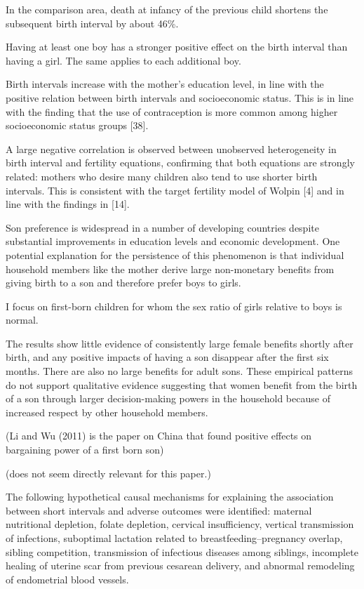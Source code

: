 In the comparison area, death at infancy of the previous child shortens
the subsequent birth interval by about 46\%.

Having at least one boy has a stronger positive effect on the birth
interval than having a girl. The same applies to each additional boy.

Birth intervals increase with the mother’s education level, in line with
the positive relation between birth intervals and socioeconomic status.
This is in line with the finding that the use of contraception is more
common among higher socioeconomic status groups [38].

A large negative correlation is observed between unobserved
heterogeneity in birth interval and fertility equations, confirming that
both equations are strongly related: mothers who desire many children
also tend to use shorter birth intervals. This is consistent with the
target fertility model of Wolpin [4] and in line with the findings in
[14].

\citet{Zimmermann2018}

Son preference is widespread in a number of developing countries despite
substantial improvements in education levels and economic development.
One potential explanation for the persistence of this phenomenon is that
individual household members like the mother derive large non-monetary
beneﬁts from giving birth to a son and therefore prefer boys to girls.

I focus on ﬁrst-born children for whom the sex ratio of girls relative to boys is normal.

The results show little evidence of consistently large female beneﬁts
shortly after birth, and any positive impacts of having a son disappear
after the ﬁrst six months. There are also no large beneﬁts for adult
sons. These empirical patterns do not support qualitative evidence
suggesting that women beneﬁt from the birth of a son through larger
decision-making powers in the household because of increased respect by
other household members.

(Li and Wu (2011) is the paper on China that found positive effects on
bargaining power of a first born son)

(does not seem directly relevant for this paper.)

\citet{Conde-Agudelo2012}

The following hypothetical causal mechanisms for explaining the
association between short intervals and adverse outcomes were
identified: maternal nutritional depletion, folate depletion, cervical
insufficiency, vertical transmission of infections, suboptimal lactation
related to breastfeeding–pregnancy overlap, sibling competition,
transmission of infectious diseases among siblings, incomplete healing
of uterine scar from previous cesarean delivery, and abnormal remodeling
of endometrial blood vessels.

